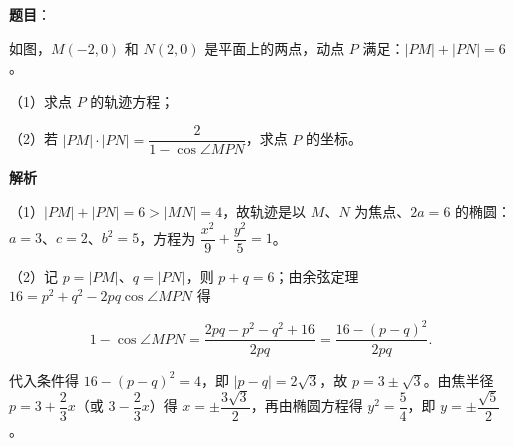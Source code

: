 \begin{answer}

\textbf{题目}：

如图，$M(-2,0)$ 和 $N(2,0)$ 是平面上的两点，动点 $P$ 满足：$|PM|+|PN|=6$。

（1）求点 $P$ 的轨迹方程；

（2）若 $|PM|\cdot|PN|=\dfrac2{1-\cos\angle MPN}$，求点 $P$ 的坐标。
\nopagebreak[4]
\begin{center}\end{center}
\nopagebreak[4]
\textbf{解析}

（1）$|PM|+|PN|=6>|MN|=4$，故轨迹是以 $M$、$N$ 为焦点、$2a=6$ 的椭圆：$a=3$、$c=2$、$b^2=5$，方程为 $\dfrac{x^2}9+\dfrac{y^2}5=1$。

（2）记 $p=|PM|$、$q=|PN|$，则 $p+q=6$；由余弦定理 $16=p^2+q^2-2pq\cos\angle MPN$ 得

\nopagebreak[4]
\[1-\cos\angle MPN=\frac{2pq-p^2-q^2+16}{2pq}=\frac{16-(p-q)^2}{2pq}.\]

代入条件得 $16-(p-q)^2=4$，即 $|p-q|=2\sqrt3$，故 $p=3\pm\sqrt3$。由焦半径 $p=3+\dfrac23x$（或 $3-\dfrac23x$）得 $x=\pm\dfrac{3\sqrt3}2$，再由椭圆方程得 $y^2=\dfrac54$，即 $y=\pm\dfrac{\sqrt5}2$。


\end{answer}
